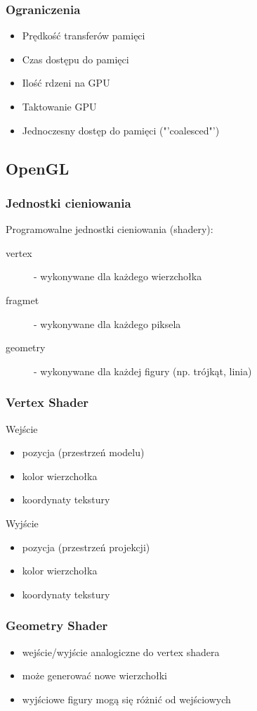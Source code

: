\documentclass{beamer}
\begin{document}
\frame
{
	\frametitle{Ograniczenia}
	\begin{itemize}
		\item{Prędkość transferów pamięci}
		\item{Czas dostępu do pamięci}
		\item{Ilość rdzeni na GPU}
		\item{Taktowanie GPU}
		\item{Jednoczesny dostęp do pamięci ("'coalesced"')}
	\end{itemize}
}

\subsection{OpenGL}\label{sub:opengl}

\frame
{
	\frametitle{Jednostki cieniowania}

	Programowalne jednostki cieniowania (shadery):

	\begin{description}
	\item[vertex] - wykonywane dla każdego wierzchołka
	\item[fragmet] - wykonywane dla każdego piksela
	\pause
	\item[geometry] - wykonywane dla każdej figury (np. trójkąt, linia)
	\end{description}

}

\frame
{
	\frametitle{Vertex Shader}
	\begin{block}{Wejście}
	\begin{itemize}
	\item pozycja (przestrzeń modelu)
	\item kolor wierzchołka
	\item koordynaty tekstury
	\end{itemize}
	\end{block}
	\begin{block}{Wyjście}
	\begin{itemize}
	\item pozycja (przestrzeń projekcji)
	\item kolor wierzchołka
	\item koordynaty tekstury
	\end{itemize}
	\end{block}
}

\frame
{
	\frametitle{Geometry Shader}

	\begin{itemize}
	\item wejście/wyjście analogiczne do vertex shadera
	\item może generować nowe wierzchołki
	\item wyjściowe figury mogą się różnić od wejściowych
	\end{itemize}
}
\end{document}
